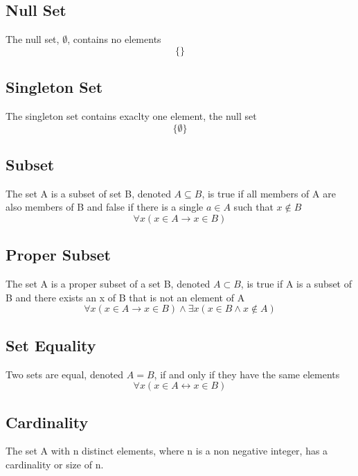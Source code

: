 \documentclass[12pt]{article}
\begin{document}
\subsection{Null Set}
The null set, $\emptyset$, contains no elements
\begin{equation}
\{ \}
\end{equation}

\subsection{Singleton Set}
The singleton set contains exaclty one element, the null set
\begin{equation}
\{ \emptyset\}
\end{equation}

\subsection{Subset}
The set A is a subset of set B, denoted $A \subseteq B$,
is true 
if all members of A are also members of B
and false 
if there is a single $a \in A$ such that $x \not \in B$
\begin{equation}
\forall x (x \in A \rightarrow x \in B)
\end{equation}

\subsection{Proper Subset}
The set A is a proper subset of a set B, denoted $A \subset B$,
is true 
if A is a subset of B 
and 
there exists an x of B that is not an element of A
\begin{equation}
\forall x (x \in A \rightarrow x \in B) \wedge \exists x (x \in B \wedge x \not \in A)
\end{equation}

\subsection{Set Equality}
Two sets are equal, denoted $A = B$,
if and only if
they have the same elements
\begin{equation}
\forall x(x \in A \leftrightarrow x \in B)
\end{equation}

\subsection{Cardinality}
The set A with n distinct elements, where n is a non negative integer,
has a cardinality or size of n.
\end{document}

